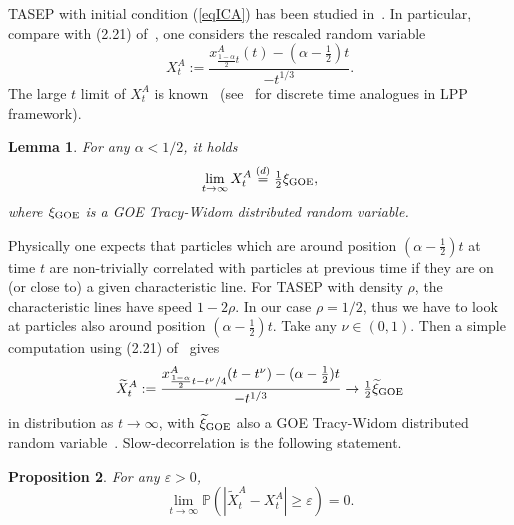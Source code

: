 \documentclass[12pt,a4paper]{article}
\numberwithin{equation}{section}
\newcommand{\Pb}{\mathbb{P}}
\newcommand{\e}{\varepsilon}
\newtheorem{prop}{Proposition}[section]
\newtheorem{lem}[prop]{Lemma}
\begin{document}
TASEP with initial condition (\ref{eqICA}) has been studied in~\cite{BFS07}. In particular, compare with (2.21) of~\cite{BFS07}, one considers the rescaled random variable
\begin{equation}
X^{A}_t:=\frac{x^A_{\frac{1-\alpha}{2}t}(t)-(\alpha-\tfrac12)t}{-t^{1/3}}.
\end{equation}
The large $t$ limit of $X^A_t$ is known~\cite{BFS07} (see~\cite{BR99,BR99b,Jo03b} for discrete time analogues in LPP framework).
\begin{lem}\label{lemGOE}
For any $\alpha<1/2$, it holds
\begin{equation}
\lim_{t\to\infty} X^{A}_t\stackrel{(d)}{=}  \tfrac12 \xi_{\rm GOE},
\end{equation}
where $\xi_{\rm GOE}$ is a GOE Tracy-Widom distributed random variable.
\end{lem}
Physically one expects that particles which are around position $(\alpha-\tfrac12)t$ at time $t$ are non-trivially correlated with particles at previous time if they are on (or close to) a given characteristic line. For TASEP with density $\rho$, the characteristic lines have speed $1-2\rho$. In our case $\rho=1/2$, thus we have to look at particles also around position $(\alpha-\tfrac12)t$. Take any $\nu\in (0,1)$. Then a simple computation using (2.21) of~\cite{BFS07} gives
\begin{equation}
\widetilde X^{A}_t:=\frac{x^A_{\frac{1-\alpha}{2}t-t^\nu/4}(t-t^\nu)-(\alpha-\tfrac12)t}{-t^{1/3}}\to  \tfrac12 \widetilde\xi_{\rm GOE}
\end{equation}
in distribution as $t\to\infty$, with $\widetilde \xi_{\rm GOE}$ also a GOE Tracy-Widom distributed random variable~\cite{TW96}. Slow-decorrelation is the following statement.
\begin{prop}
For any $\e>0$,
\begin{equation}
\lim_{t\to\infty}\Pb(|\widetilde X^{A}_t-X^{A}_t|\geq \e)=0.
\end{equation}
\end{prop}
\end{document}
